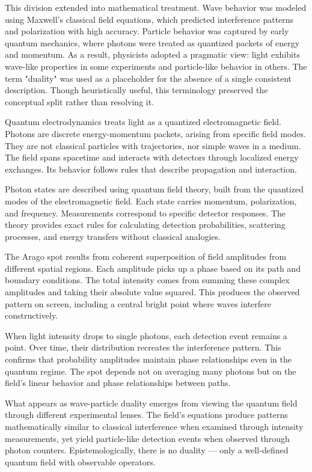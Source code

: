 This division extended into mathematical treatment. Wave behavior was modeled using Maxwell's classical field equations, which predicted interference patterns and polarization with high accuracy. Particle behavior was captured by early quantum mechanics, where photons were treated as quantized packets of energy and momentum. As a result, physicists adopted a pragmatic view: light exhibits wave-like properties in some experiments and particle-like behavior in others. The term "duality" was used as a placeholder for the absence of a single consistent description. Though heuristically useful, this terminology preserved the conceptual split rather than resolving it.

Quantum electrodynamics treats light as a quantized electromagnetic field. Photons are discrete energy-momentum packets, arising from specific field modes. They are not classical particles with trajectories, nor simple waves in a medium. The field spans spacetime and interacts with detectors through localized energy exchanges. Its behavior follows rules that describe propagation and interaction.

Photon states are described using quantum field theory, built from the quantized modes of the electromagnetic field. Each state carries momentum, polarization, and frequency. Measurements correspond to specific detector responses. The theory provides exact rules for calculating detection probabilities, scattering processes, and energy transfers without classical analogies.

The Arago spot results from coherent superposition of field amplitudes from different spatial regions. Each amplitude picks up a phase based on its path and boundary conditions. The total intensity comes from summing these complex amplitudes and taking their absolute value squared. This produces the observed pattern on screen, including a central bright point where waves interfere constructively.

When light intensity drops to single photons, each detection event remains a point. Over time, their distribution recreates the interference pattern. This confirms that probability amplitudes maintain phase relationships even in the quantum regime. The spot depends not on averaging many photons but on the field's linear behavior and phase relationships between paths.

What appears as wave-particle duality emerges from viewing the quantum field through different experimental lenses. The field's equations produce patterns mathematically similar to classical interference when examined through intensity measurements, yet yield particle-like detection events when observed through photon counters. Epistemologically, there is no duality — only a well-defined quantum field with observable operators.

